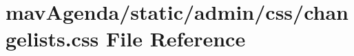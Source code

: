 \hypertarget{changelists_8css}{}\section{mav\+Agenda/static/admin/css/changelists.css File Reference}
\label{changelists_8css}
